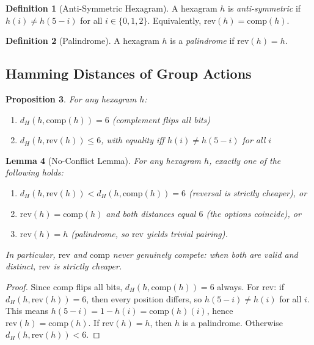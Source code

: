 \documentclass[11pt]{article}
\theoremstyle{definition}
\newtheorem{definition}{Definition}[section]
\theoremstyle{plain}
\newtheorem{lemma}[definition]{Lemma}
\newtheorem{proposition}[definition]{Proposition}
\newcommand{\Ham}{d_H}
\newcommand{\comp}{\mathrm{comp}}
\newcommand{\rev}{\mathrm{rev}}
\begin{document}
\begin{definition}[Anti-Symmetric Hexagram]
A hexagram $h$ is \emph{anti-symmetric} if $h(i) \neq h(5-i)$ for all $i \in \{0,1,2\}$. Equivalently, $\rev(h) = \comp(h)$.
\end{definition}

\begin{definition}[Palindrome]
A hexagram $h$ is a \emph{palindrome} if $\rev(h) = h$.
\end{definition}

\subsection{Hamming Distances of Group Actions}

\begin{proposition}\label{prop:distances}
For any hexagram $h$:
\begin{enumerate}
    \item $\Ham(h, \comp(h)) = 6$ (complement flips all bits)
    \item $\Ham(h, \rev(h)) \leq 6$, with equality iff $h(i) \neq h(5-i)$ for all $i$
\end{enumerate}
\end{proposition}

\begin{lemma}[No-Conflict Lemma]\label{lem:noconflict}
For any hexagram $h$, exactly one of the following holds:
\begin{enumerate}
    \item $\Ham(h, \rev(h)) < \Ham(h, \comp(h)) = 6$ (reversal is strictly cheaper), or
    \item $\rev(h) = \comp(h)$ and both distances equal $6$ (the options coincide), or
    \item $\rev(h) = h$ (palindrome, so $\rev$ yields trivial pairing).
\end{enumerate}
In particular, $\rev$ and $\comp$ never genuinely compete: when both are valid and distinct, $\rev$ is strictly cheaper.
\end{lemma}

\begin{proof}
Since $\comp$ flips all bits, $\Ham(h, \comp(h)) = 6$ always. For $\rev$: if $\Ham(h, \rev(h)) = 6$, then every position differs, so $h(5-i) \neq h(i)$ for all $i$. This means $h(5-i) = 1 - h(i) = \comp(h)(i)$, hence $\rev(h) = \comp(h)$. If $\rev(h) = h$, then $h$ is a palindrome. Otherwise $\Ham(h, \rev(h)) < 6$.
\end{proof}
\end{document}
